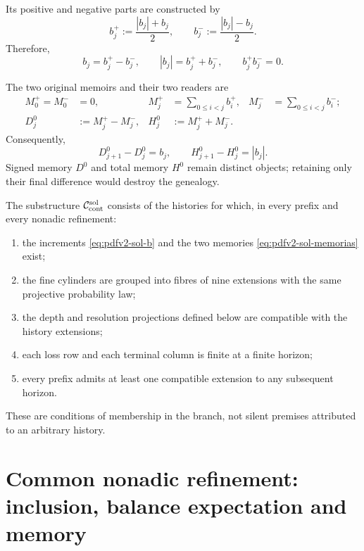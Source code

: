 Its positive and negative parts are constructed by
\begin{equation}\label{eq:pdfv2-sol-bpm}
 b_j^+:=\frac{|b_j|+b_j}{2},
 \qquad
 b_j^-:=\frac{|b_j|-b_j}{2}.
\end{equation}
Therefore,
\begin{equation}\label{eq:pdfv2-sol-bpm-identidades}
 b_j=b_j^+-b_j^-,
 \qquad
 |b_j|=b_j^++b_j^-,
 \qquad
 b_j^+b_j^-=0.
\end{equation}

The two original memoirs and their two readers are
\begin{align}
 M_0^+=M_0^-&=0,
 &M_j^+&=\sum_{0\leq i<j}b_i^+,
 &M_j^-&=\sum_{0\leq i<j}b_i^-;
 \label{eq:pdfv2-sol-memorias}\\
 D_j^0&:=M_j^+-M_j^-,
 &H_j^0&:=M_j^++M_j^-.
 \label{eq:pdfv2-sol-dh}
\end{align}
Consequently,
\begin{equation}\label{eq:pdfv2-sol-dh-diferencias}
 D_{j+1}^0-D_j^0=b_j,
 \qquad
 H_{j+1}^0-H_j^0=|b_j|.
\end{equation}
Signed memory \(D^0\) and total memory \(H^0\) remain distinct
objects; retaining only their final difference would destroy the genealogy.

The substructure \(\mathcal C_{\rm cont}^{\rm sol}\) consists of the histories
for which, in every prefix and every nonadic refinement:
\begin{enumerate}
 \item the increments \eqref{eq:pdfv2-sol-b} and the two memories
       \eqref{eq:pdfv2-sol-memorias} exist;
 \item the fine cylinders are grouped into fibres of nine extensions with the
       same projective probability law;
 \item the depth and resolution projections defined below are
       compatible with the history extensions;
 \item each loss row and each terminal column is finite at a finite
       horizon;
 \item every prefix admits at least one compatible extension to any
       subsequent horizon.
\end{enumerate}
These are conditions of membership in the branch, not silent premises
attributed to an arbitrary history.

\fi
\section{Common nonadic refinement: inclusion, balance expectation and memory}
\label{sec:pdfv2-sol-e9j9}

